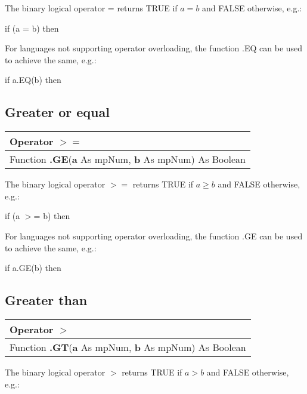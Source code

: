 \vspace{0.3cm}
The binary logical operator \textsf{=} returns TRUE if  $a = b$ and FALSE otherwise, e.g.: 

\textsf{if (a = b) then}

For languages not supporting operator overloading, the function \textsf{.EQ} can be used to achieve the same, e.g.: 

\textsf{if a.EQ(b) then}






\subsection{Greater or equal}
\begin{tabular}{p{481pt}}
	\toprule
	\textsf{Operator $\boldsymbol{>=}$}\index{Multiprecision Functions!=} \\
	\midrule
	\textsf{Function \textbf{.GE}(\textbf{a} As mpNum, \textbf{b} As mpNum) As Boolean}\index{Multiprecision Functions!.GE} \\
	\bottomrule
\end{tabular}

\vspace{0.3cm}
The binary logical operator $\boldsymbol{>=}$ returns TRUE if  $a \geq b$ and FALSE otherwise, e.g.: 

\textsf{if (a $>$= b) then}

For languages not supporting operator overloading, the function \textsf{.GE} can be used to achieve the same, e.g.: 

\textsf{if a.GE(b) then}




\subsection{Greater than}
\begin{tabular}{p{481pt}}
	\toprule
	\textsf{Operator $\boldsymbol{>}$}\index{Multiprecision Functions!=} \\
	\midrule
	\textsf{Function \textbf{.GT}(\textbf{a} As mpNum, \textbf{b} As mpNum) As Boolean}\index{Multiprecision Functions!.GT} \\
	\bottomrule
\end{tabular}

\vspace{0.3cm}
The binary logical operator $\boldsymbol{>}$ returns TRUE if  $a > b$ and FALSE otherwise, e.g.: 


